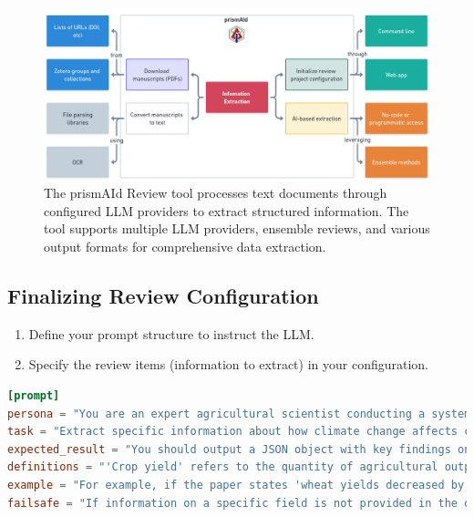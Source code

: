 \begin{figure}[h]
    \centering
    \includegraphics[width=\textwidth]{figures/info_extract_tools.png}
    \caption{The prismAId Review tool processes text documents through configured LLM providers to extract structured information. The tool supports multiple LLM providers, ensemble reviews, and various output formats for comprehensive data extraction.}
    \label{fig:review_tools}
\end{figure}

\subsection{Finalizing Review Configuration}
\begin{enumerate}
    \item Define your prompt structure to instruct the LLM.
    \item Specify the review items (information to extract) in your configuration.
\end{enumerate}

\begin{configbox}
\begin{lstlisting}[language=TOML]
[prompt]
persona = "You are an expert agricultural scientist conducting a systematic review on climate change impacts."
task = "Extract specific information about how climate change affects crop yields from the scientific paper text provided."
expected_result = "You should output a JSON object with key findings on crop types, climate factors, and measured impacts."
definitions = "'Crop yield' refers to the quantity of agricultural output harvested per unit of land area."
example = "For example, if the paper states 'wheat yields decreased by 5.2% per degree Celsius increase', report 'wheat' as crop_type, 'temperature increase' as climate_factor, and '-5.2% per °C' as yield_impact."
failsafe = "If information on a specific field is not provided in the document, respond with an empty string value."
\end{lstlisting}
\end{configbox}

